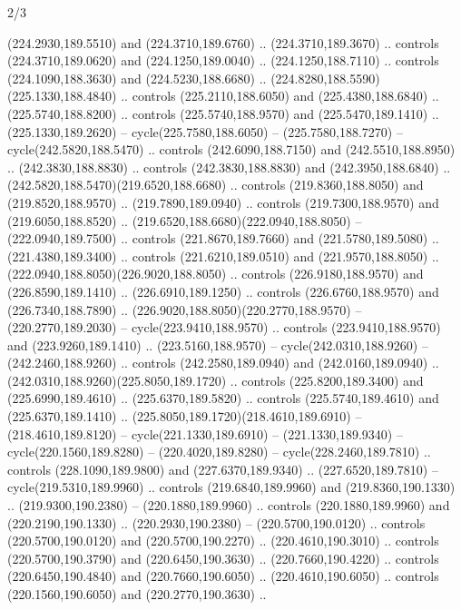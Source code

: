 \begin{flagdescription}{2/3}
\begin{scope}[xshift=0.5\flaglength,yshift=0.5\flagwidth,scale=\flagwidth/259.2]
\begin{scope}[y=0.8pt, x=0.8pt, yscale=-1,shift={(-243,-162)}]
      (224.2930,189.5510) and (224.3710,189.6760) .. (224.3710,189.3670) .. controls
      (224.3710,189.0620) and (224.1250,189.0040) .. (224.1250,188.7110) .. controls
      (224.1090,188.3630) and (224.5230,188.6680) ..
      (224.8280,188.5590)(225.1330,188.4840) .. controls (225.2110,188.6050) and
      (225.4380,188.6840) .. (225.5740,188.8200) .. controls (225.5740,188.9570) and
      (225.5470,189.1410) .. (225.1330,189.2620) -- cycle(225.7580,188.6050) --
      (225.7580,188.7270) -- cycle(242.5820,188.5470) .. controls
      (242.6090,188.7150) and (242.5510,188.8950) .. (242.3830,188.8830) .. controls
      (242.3830,188.8830) and (242.3950,188.6840) ..
      (242.5820,188.5470)(219.6520,188.6680) .. controls (219.8360,188.8050) and
      (219.8520,188.9570) .. (219.7890,189.0940) .. controls (219.7300,188.9570) and
      (219.6050,188.8520) .. (219.6520,188.6680)(222.0940,188.8050) --
      (222.0940,189.7500) .. controls (221.8670,189.7660) and (221.5780,189.5080) ..
      (221.4380,189.3400) .. controls (221.6210,189.0510) and (221.9570,188.8050) ..
      (222.0940,188.8050)(226.9020,188.8050) .. controls (226.9180,188.9570) and
      (226.8590,189.1410) .. (226.6910,189.1250) .. controls (226.6760,188.9570) and
      (226.7340,188.7890) .. (226.9020,188.8050)(220.2770,188.9570) --
      (220.2770,189.2030) -- cycle(223.9410,188.9570) .. controls
      (223.9410,188.9570) and (223.9260,189.1410) .. (223.5160,188.9570) --
      cycle(242.0310,188.9260) -- (242.2460,188.9260) .. controls
      (242.2580,189.0940) and (242.0160,189.0940) ..
      (242.0310,188.9260)(225.8050,189.1720) .. controls (225.8200,189.3400) and
      (225.6990,189.4610) .. (225.6370,189.5820) .. controls (225.5740,189.4610) and
      (225.6370,189.1410) .. (225.8050,189.1720)(218.4610,189.6910) --
      (218.4610,189.8120) -- cycle(221.1330,189.6910) -- (221.1330,189.9340) --
      cycle(220.1560,189.8280) -- (220.4020,189.8280) -- cycle(228.2460,189.7810) ..
      controls (228.1090,189.9800) and (227.6370,189.9340) .. (227.6520,189.7810) --
      cycle(219.5310,189.9960) .. controls (219.6840,189.9960) and
      (219.8360,190.1330) .. (219.9300,190.2380) -- (220.1880,189.9960) .. controls
      (220.1880,189.9960) and (220.2190,190.1330) .. (220.2930,190.2380) --
      (220.5700,190.0120) .. controls (220.5700,190.0120) and (220.5700,190.2270) ..
      (220.4610,190.3010) .. controls (220.5700,190.3790) and (220.6450,190.3630) ..
      (220.7660,190.4220) .. controls (220.6450,190.4840) and (220.7660,190.6050) ..
      (220.4610,190.6050) .. controls (220.1560,190.6050) and (220.2770,190.3630) ..

\end{scope}
\end{scope}
\end{flagdescription}
